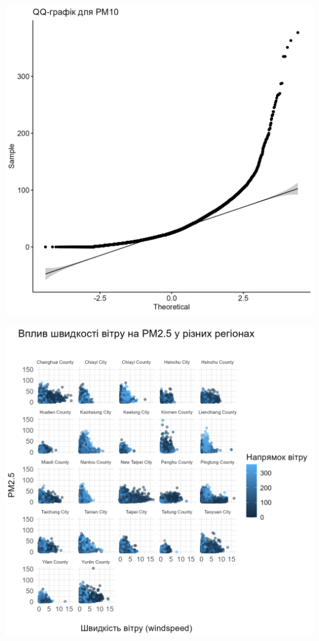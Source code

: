 \documentclass[./report.tex]{subfiles}
\begin{document}
\begin{enumerate}
  \includegraphics[width=\linewidth]{plots/question1/qq_pm10.png}

  \includegraphics[width=\linewidth]{plots/question1/scatter_pm2_5_region.png}


\end{enumerate}
\end{document}
